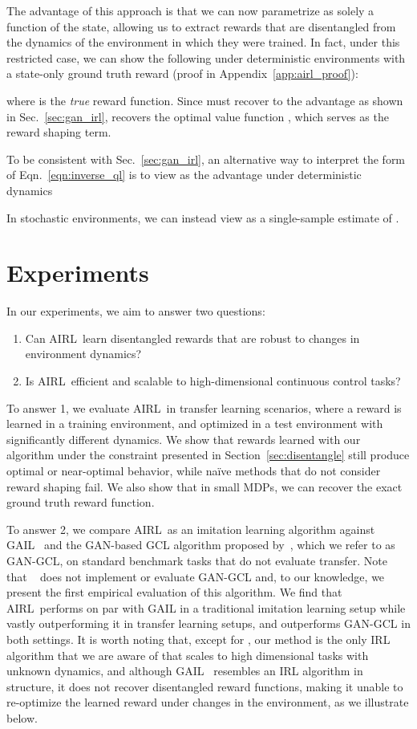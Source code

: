 \documentclass{article} \usepackage{iclr2018_conference,times}
\newcommand{\algnameabbrev}{AIRL}
\begin{document}
The advantage of this approach is that we can now parametrize  as solely a function of the state, allowing us to extract rewards that are disentangled from the dynamics of the environment in which they were trained. In fact, under this restricted case, we can show the following under deterministic environments with a state-only ground truth reward (proof in Appendix~\ref{app:airl_proof}):


where  is the \textit{true} reward function. Since  must recover to the advantage as shown in Sec.~\ref{sec:gan_irl},  recovers the optimal value function , which serves as the reward shaping term.

To be consistent with Sec.~\ref{sec:gan_irl}, an alternative way to interpret the form of Eqn.~\ref{eqn:inverse_ql} is to view  as the advantage under deterministic dynamics

In stochastic environments, we can instead view  as a single-sample estimate of .

 
\section{Experiments}
In our experiments, we aim to answer two questions:
\begin{enumerate}
\item Can \algnameabbrev\ learn disentangled rewards that are robust to changes in environment dynamics?
\item Is \algnameabbrev\ efficient and scalable to high-dimensional continuous control tasks?
\end{enumerate}
To answer 1, we evaluate \algnameabbrev\ in transfer learning scenarios, where a reward is learned in a training environment, and optimized in a test environment with significantly different dynamics. We show that rewards learned with our algorithm under the constraint presented in Section~\ref{sec:disentangle} still produce optimal or near-optimal behavior, while na\"ive methods that do not consider reward shaping fail. We also show that in small MDPs, we can recover the exact ground truth reward function.

To answer 2, we compare \algnameabbrev\ as an imitation learning algorithm against GAIL~\citep{Ho16b} and the GAN-based GCL algorithm proposed by~\citet{Finn16b}, which we refer to as GAN-GCL, on standard benchmark tasks that do not evaluate transfer. Note that ~\citet{Finn16b} does not implement or evaluate GAN-GCL and, to our knowledge, we present the first empirical evaluation of this algorithm. We find that \algnameabbrev\ performs on par with GAIL in a traditional imitation learning setup while vastly outperforming it in transfer learning setups, and outperforms GAN-GCL in both settings. It is worth noting that, except for \citep{Finn16a}, our method is the only IRL algorithm that we are aware of that scales to high dimensional tasks with unknown dynamics, and although GAIL~\citep{Ho16b} resembles an IRL algorithm in structure, it does not recover disentangled reward functions, making it unable to re-optimize the learned reward under changes in the environment, as we illustrate below.
\end{document}
